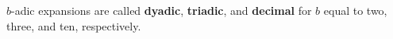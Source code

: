 $b$-adic expansions are called \textbf{dyadic}, \textbf{triadic}, and \textbf{decimal} for $b$ equal to two, three, and ten, respectively.
